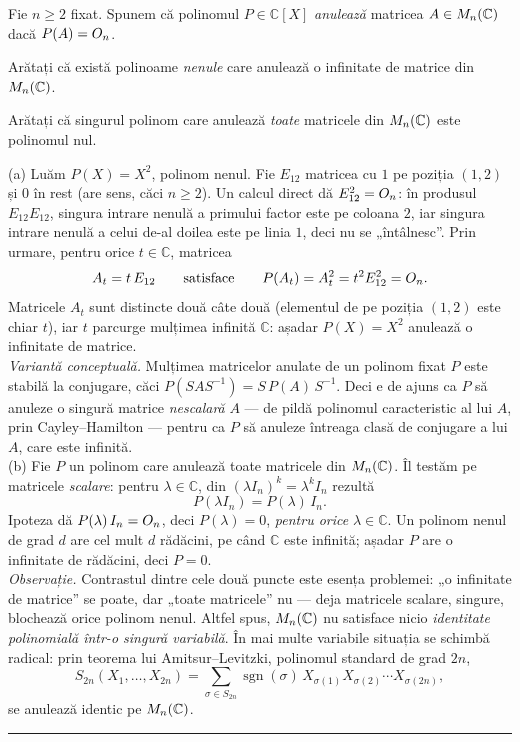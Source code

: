 Fie $n\ge2$ fixat. Spunem că polinomul $P\in\mathbb{C}[X]$ \emph{anulează} matricea $A\in M_n(\mathbb{C})$ dacă $P(A)=O_n$.
\begin{parti}
  \item Arătați că există polinoame \emph{nenule} care anulează o infinitate de matrice din $M_n(\mathbb{C})$.
  \item Arătați că singurul polinom care anulează \emph{toate} matricele din $M_n(\mathbb{C})$ este polinomul nul.
\end{parti}
\sol (a) Luăm $P(X)=X^2$, polinom nenul. Fie $E_{12}$ matricea cu $1$ pe poziția $(1,2)$ și $0$ în rest (are sens, căci $n\ge2$). Un calcul direct dă $E_{12}^2=O_n$: în produsul $E_{12}E_{12}$, singura intrare nenulă a primului factor este pe coloana $2$, iar singura intrare nenulă a celui de-al doilea este pe linia $1$, deci nu se „întâlnesc''. Prin urmare, pentru orice $t\in\mathbb{C}$, matricea
\[ A_t=t\,E_{12} \qquad\text{satisface}\qquad P(A_t)=A_t^2=t^2E_{12}^2=O_n . \]
Matricele $A_t$ sunt distincte două câte două (elementul de pe poziția $(1,2)$ este chiar $t$), iar $t$ parcurge mulțimea infinită $\mathbb{C}$: așadar $P(X)=X^2$ anulează o infinitate de matrice.\\[2pt]
\emph{Variantă conceptuală.} Mulțimea matricelor anulate de un polinom fixat $P$ este stabilă la conjugare, căci $P(SAS^{-1})=S\,P(A)\,S^{-1}$. Deci e de ajuns ca $P$ să anuleze o singură matrice \emph{nescalară} $A$ --- de pildă polinomul caracteristic al lui $A$, prin Cayley--Hamilton --- pentru ca $P$ să anuleze întreaga clasă de conjugare a lui $A$, care este infinită.\\[2pt]
(b) Fie $P$ un polinom care anulează toate matricele din $M_n(\mathbb{C})$. Îl testăm pe matricele \emph{scalare}: pentru $\lambda\in\mathbb{C}$, din $(\lambda I_n)^k=\lambda^kI_n$ rezultă
\[ P(\lambda I_n)=P(\lambda)\,I_n . \]
Ipoteza dă $P(\lambda)\,I_n=O_n$, deci $P(\lambda)=0$, \emph{pentru orice} $\lambda\in\mathbb{C}$. Un polinom nenul de grad $d$ are cel mult $d$ rădăcini, pe când $\mathbb{C}$ este infinită; așadar $P$ are o infinitate de rădăcini, deci $P=0$.\\[2pt]
\emph{Observație.} Contrastul dintre cele două puncte este esența problemei: „o infinitate de matrice'' se poate, dar „toate matricele'' nu --- deja matricele scalare, singure, blochează orice polinom nenul. Altfel spus, $M_n(\mathbb{C})$ nu satisface nicio \emph{identitate polinomială într-o singură variabilă}. În mai multe variabile situația se schimbă radical: prin teorema lui Amitsur--Levitzki, polinomul standard de grad $2n$,
\[ S_{2n}(X_1,\dots,X_{2n})=\sum_{\sigma\in S_{2n}}\operatorname{sgn}(\sigma)\,X_{\sigma(1)}X_{\sigma(2)}\cdots X_{\sigma(2n)}, \]
se anulează identic pe $M_n(\mathbb{C})$.
\vspace{1mm}\hrule

